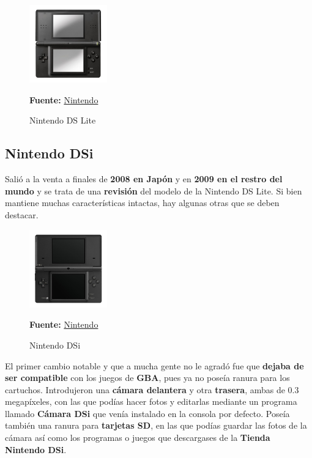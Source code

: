 \begin{figure}[htbp]
\centering
  \includegraphics[width=0.3\textwidth]{archivos/ndslite.jpg}
  \caption{Nintendo DS Lite}
    \textbf{Fuente:} \href{https://www.nintendo.co.uk/Nintendo-DS/Nintendo-DS-Family-Nintendo-UK-s-official-site-Nintendo-DS-Nintendo-DSi-Nintendo-DSi-XL-116380.html}{Nintendo}
  \label{fig:ndslite}
\end{figure}

\vspace{1cm}

\subsection{Nintendo DSi}

Salió a la venta a finales de \textbf{2008 en Japón} y en \textbf{2009 en el restro del mundo} y se trata de una \textbf{revisión} del modelo de la Nintendo DS Lite. Si bien mantiene muchas características intactas, hay algunas otras que se deben destacar.

\vspace{0.5cm}

\begin{figure}[htbp]
\centering
  \includegraphics[width=0.3\textwidth]{archivos/ndsi.jpg}
  \caption{Nintendo DSi}
    \textbf{Fuente:} \href{https://www.nintendo.co.uk/Nintendo-DS/Nintendo-DS-Family-Nintendo-UK-s-official-site-Nintendo-DS-Nintendo-DSi-Nintendo-DSi-XL-116380.html}{Nintendo}
  \label{fig:ndsi}
\end{figure}

\vspace{0.5cm}

El primer cambio notable y que a mucha gente no le agradó fue que \textbf{dejaba de ser compatible} con los juegos de \textbf{GBA}, pues ya no poseía ranura para los cartuchos. Introdujeron una \textbf{cámara delantera} y otra \textbf{trasera}, ambas de 0.3 megapíxeles, con las que podías hacer fotos y editarlas mediante un programa llamado \textbf{Cámara DSi} que venía instalado en la consola por defecto.  Poseía también una ranura para \textbf{tarjetas SD}, en las que podías guardar las fotos de la cámara así como los programas o juegos que descargases de la \textbf{Tienda Nintendo DSi}.

